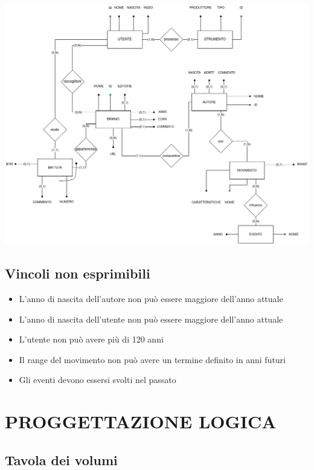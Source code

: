 \documentclass{article}
\begin{document}
    \begin{center}
        \includegraphics[width=\linewidth]{immagini/01_diagrammaER.png}   %
    \end{center}

    \subsection{Vincoli non esprimibili}

    \begin{itemize}
        \item L'anno di nascita dell'autore non può essere maggiore dell'anno attuale
        \item L'anno di nascita dell'utente non può essere maggiore dell'anno attuale
        \item L'utente non può avere più di 120 anni
        \item Il range del movimento non può avere un termine definito in anni futuri
        \item Gli eventi devono essersi svolti nel passato
    \end{itemize}

    \section{PROGGETTAZIONE LOGICA}

    \subsection{Tavola dei volumi}
\end{document}
